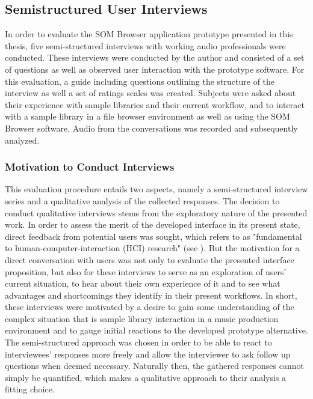 
\subsection{Semistructured User Interviews}
\label{subsec:evaluation_interviews}

In order to evaluate the SOM Browser application prototype presented in this
thesis, five semi-structured interviews with working audio professionals were
conducted. These interviews were conducted by the author and consisted of a set
of questions as well as observed user interaction with the prototype software.
For this evaluation, a guide including questions outlining the
structure of the interview as well a set of ratings scales was created. Subjects
were asked about their experience with sample libraries and their current
workflow, and to interact with a sample library in a file browser environment as
well as using the SOM Browser software. Audio from the conversations was
recorded and subsequently analyzed.

\subsubsection{Motivation to Conduct Interviews}
\label{subsubsec:interview_motivation}

This evaluation procedure entails two aspects, namely a semi-structured
interview series and a qualitative analysis of the collected responses. The
decision to conduct qualitative interviews stems from the exploratory nature of
the presented work. In order to assess the merit of the developed interface in
its present state, direct feedback from potential users was sought, which
\citet{lazar2017} refers to as "fundamental to human-computer-interaction (HCI)
research" (see \citet[p.187]{lazar2017}). But the motivation for a direct
conversation with users was not only to evaluate the presented interface
proposition, but also for these interviews to serve as an exploration of users'
current situation, to hear about their own experience of it and to see what
advantages and shortcomings they identify in their present workflows. In short,
these interviews were motivated by a desire to gain some understanding of the
complex situation that is sample library interaction in a music production
environment and to gauge initial reactions to the developed prototype
alternative. The semi-structured approach was chosen in order to be able to
react to interviewees' responses more freely and allow the interviewer to ask
follow up questions when deemed necessary. Naturally then, the gathered
responses cannot simply be quantified, which makes a qualitative approach to
their analysis a fitting choice.

